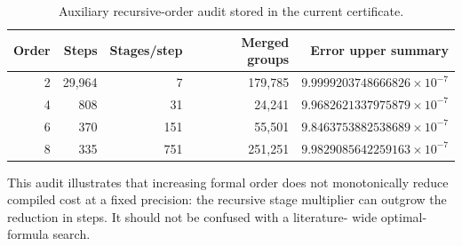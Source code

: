 \begin{table}[t]
\centering
\caption{Auxiliary recursive-order audit stored in the current certificate.}
\label{tab:recursive-audit}
\begin{tabular}{@{}rrrrr@{}}
\toprule
Order & Steps & Stages/step & Merged groups & Error upper summary \\
\midrule
2 & 29,964 & 7 & 179,785 & $9.9999203748666826\times10^{-7}$ \\
4 & 808 & 31 & 24,241 & $9.9682621337975879\times10^{-7}$ \\
6 & 370 & 151 & 55,501 & $9.8463753882538689\times10^{-7}$ \\
8 & 335 & 751 & 251,251 & $9.9829085642259163\times10^{-7}$ \\
\bottomrule
\end{tabular}
\end{table}

This audit illustrates that increasing formal order does not monotonically
reduce compiled cost at a fixed precision: the recursive stage multiplier can
outgrow the reduction in steps.  It should not be confused with a literature-
wide optimal-formula search.
